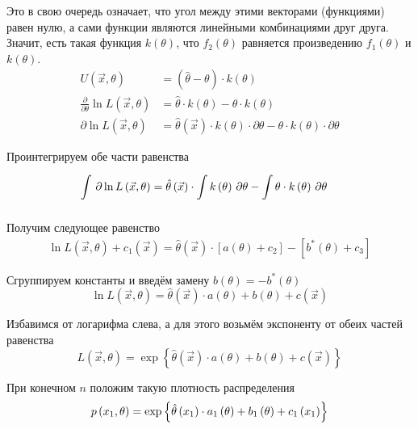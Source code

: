 Это в свою очередь означает,
что угол между этими векторами (функциями) равен нулю,
а сами функции являются линейными комбинациями друг друга.
Значит, есть такая функция $k\left( \theta \right)$, что
$f_2\left( \theta \right)$ равняется произведению
$f_1\left( \theta \right)$ и $k\left( \theta \right)$.
\begin{align*}
  U\left( \vec{x},\theta \right)
    &=\left( \hat{\theta}-\theta \right)\cdot k\left( \theta \right)\\
  \frac{\partial}{\partial\theta}\ln{L\left( \vec{x},\theta \right)}
    &=\hat{\theta}\cdot k\left( \theta \right)
      -\theta\cdot k\left( \theta \right)\\
  \partial\ln{L\left( \vec{x},\theta \right)}
    &=\hat{\theta}\left( \vec{x} \right)
        \cdot k\left( \theta \right)\cdot\partial\theta
      -\theta\cdot k\left( \theta \right)\cdot\partial\theta
\end{align*}

Проинтегрируем обе части равенства
\begin{align*}
  \int\limits_{}^{}  \, \partial \ln{L\left( \vec{x},\theta \right)}
    &=\hat{\theta}\left( \vec{x} \right)
        \cdot \int\limits_{}^{} k\left( \theta \right) \, \partial \theta
      -\int\limits_{}^{} \theta\cdot k\left( \theta \right) \, \partial \theta
\end{align*}

Получим следующее равенство
\begin{align*}
  \ln{L\left( \vec{x},\theta \right)}+c_1\left( \vec{x} \right)
    =\hat{\theta}\left( \vec{x} \right)
        \cdot \left[ a\left( \theta \right)+c_2\right]
      -\left[b^*\left( \theta \right)+c_3\right]
\end{align*}

Сгруппируем константы и введём замену
$b\left( \theta \right)=-b^*\left( \theta \right)$
$$\ln{L\left( \vec{x},\theta \right)}
  =\hat{\theta}\left( \vec{x} \right)\cdot a\left( \theta \right)
    +b\left( \theta \right)+c\left( \vec{x} \right)$$

Избавимся от логарифма слева, а для этого возьмём экспоненту от обеих частей
равенства
$$L\left( \vec{x},\theta \right)
  =\exp{\left\{\hat{\theta}\left( \vec{x} \right)\cdot a\left( \theta \right)
  +b\left( \theta \right)+c\left( \vec{x} \right)\right\}}$$

При конечном $n$ положим такую плотность распределения
$$p\left(x_1,\theta\right)
  =\exp{\left\{\hat{\theta}\left(x_1\right)\cdot a_1\left(\theta\right)
    +b_1\left( \theta \right)+c_1\left( x_1 \right)\right\}}$$

